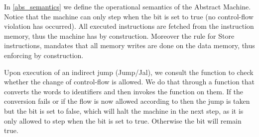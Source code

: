 In \cref{abs_semantics} we define the operational semantics of the Abstract Machine.
Notice that the machine can only step when the \ok bit is set to true (\IE no control-flow
violation has occurred). All executed instructions are fetched from
the instruction memory, thus the machine has \NXD by construction. Moreover
the rule for Store instructions, mandates that all memory writes are done on the
data memory, thus enforcing \NWC by construction.

Upon execution of an indirect jump (Jump/Jal), we consult the \CFG
function to check whether the change of control-flow is allowed. We do
that through a function \J that converts the words to identifiers and
then invokes the \CFG function on them. If the conversion fails or if
the flow is now allowed according to \CFG then the jump is taken but
the \ok bit is set to false, which will halt the machine in the next
step, as it is only allowed to step when the \ok bit is set to
true. Otherwise the \ok bit will remain true.

